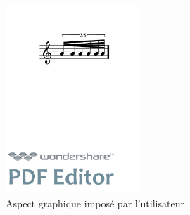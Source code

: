 \documentclass{article}
\newenvironment{code}
  {\fontfamily{pnc}\selectfont}{}
\begin{document}

\begin{figure}[h]
\centering
\begin{code}
[ \textbackslash{}fBeam\textless{}durations="1/16,1/64", drawDuration="true"\textgreater{}(a/8 a/16 a a a/32 a) ]
\end{code}

\includegraphics[width=5cm]{img/durations.pdf}
\caption{Aspect graphique imposé par l'utilisateur}
\label{fig:utilisateur}
\end{figure}
\end{document}
